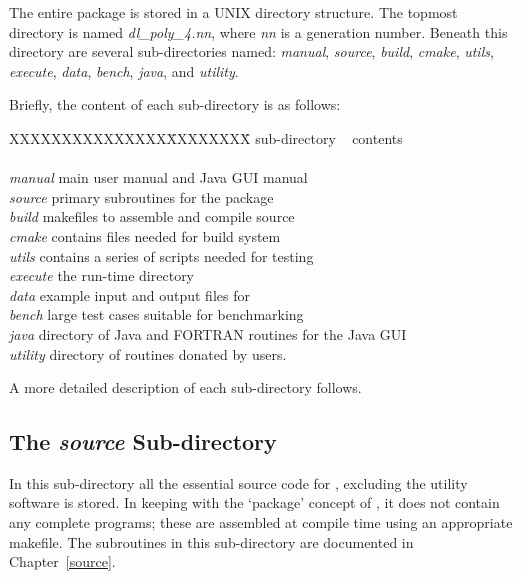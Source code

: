 The entire \D package is stored in a UNIX directory structure. The
topmost directory is named {\em dl\_poly\_4.nn}, where {\em nn} is
a generation number.  Beneath this directory are several
sub-directories named:
{\em manual},
{\em source},
{\em build},
{\em cmake},
{\em utils},
{\em execute},
{\em data},
{\em bench},
{\em java}, and
{\em utility}.

Briefly, the content of each sub-directory is as follows:
\begin{tabbing}
XXXXXXXXXXXXXXX\= XXXXXXXX\= \kill
sub-directory\> ~ \> contents \\
\> ~ \> \\
{\em manual}  \> \D main user manual and \D Java GUI manual \\
{\em source}  \> primary subroutines for the \D package \\
{\em build}   \> makefiles to assemble and compile \D source \\
{\em cmake}   \> contains files needed for  build system \\
{\em utils}   \> contains a series of scripts needed for testing \\
{\em execute} \> the \D run-time directory \\
{\em data}    \> example input and output files for \D \\
{\em bench}   \> large test cases suitable for benchmarking \\
{\em java}    \> directory of Java and FORTRAN routines for the Java GUI \\
{\em utility} \> directory of routines donated by \D users.
\end{tabbing}

\noindent A more detailed description of each sub-directory follows.

\subsection{The {\em source} Sub-directory}

In this sub-directory all the essential source code for \D,
excluding the utility software is stored.  In keeping with the
`package' concept of \D, it does not contain any complete
programs; these are assembled at compile time using an appropriate
makefile.  The subroutines in this sub-directory are documented in
Chapter~\ref{source}.

